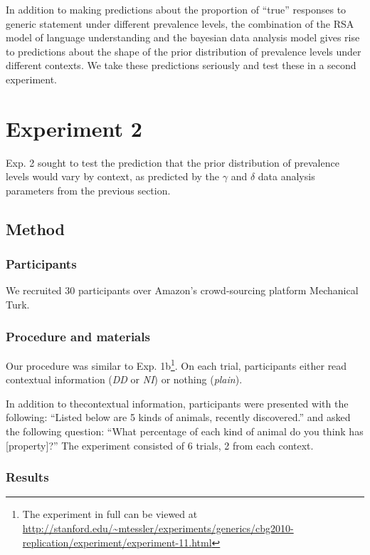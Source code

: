 \documentclass[10pt,letterpaper]{article}
\begin{document}
In addition to making predictions about the proportion of ``true'' responses to generic statement under different prevalence levels, the combination of the RSA model of language understanding and the bayesian data analysis model gives rise to predictions about the shape of the prior distribution of prevalence levels under different contexts. We take these predictions seriously and test these in a second experiment. 

\section{Experiment 2}

Exp. 2 sought to test the prediction that the prior distribution of prevalence levels would vary by context, as predicted by the $\gamma$ and $\delta$ data analysis parameters from the previous section.

\subsection{Method}

\subsubsection{Participants}

We recruited 30 participants over Amazon's crowd-sourcing platform Mechanical Turk. 

\subsubsection{Procedure and materials}

Our procedure was similar to Exp. 1b\footnote{The experiment in full can be viewed at \url{http://stanford.edu/~mtessler/experiments/generics/cbg2010-replication/experiment/experiment-11.html}}. On each trial, participants either read contextual information (\emph{DD} or \emph{NI}) or nothing (\emph{plain}). 

In addition to thecontextual information, participants were presented with the following: ``Listed below are 5 kinds of animals, recently discovered.'' and asked the following question: ``What percentage of each kind of animal do you think has [property]?'' The experiment consisted of 6 trials, 2 from each context. 

\subsubsection{Results}
\end{document}
